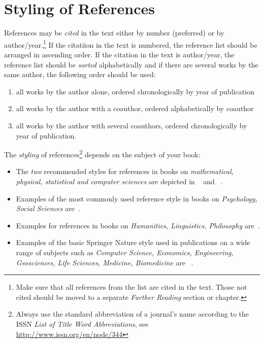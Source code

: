 %
%
% 
% 
%
\section{Styling of References}
References may be \textit{cited} in the text either by number (preferred) or by author/year.\footnote{Make sure that all references from the list are cited in the text. Those not cited should be moved to a separate \textit{Further Reading} section or chapter.} If the citatiion in the text is numbered, the reference list should be arranged in ascending order. If the citation in the text is author/year, the reference list should be \textit{sorted} alphabetically and if there are several works by the same author, the following order should be used:
\begin{enumerate}
\item all works by the author alone, ordered chronologically by year of publication
\item all works by the author with a coauthor, ordered alphabetically by coauthor
\item all works by the author with several coauthors, ordered chronologically by year of publication.
\end{enumerate}
The \textit{styling} of references\footnote{Always use the standard abbreviation of a journal's name according to the ISSN \textit{List of Title Word Abbreviations}, see \url{http://www.issn.org/en/node/344}} depends on the subject of your book:
\begin{itemize}
\item The \textit{two} recommended styles for references in books on \textit{mathematical, physical, statistical and computer sciences} are depicted in ~\cite{science-contrib, science-online, science-mono, science-journal, science-DOI} and ~\cite{phys-online, phys-mono, phys-journal, phys-DOI, phys-contrib}.
\item Examples of the most commonly used reference style in books on \textit{Psychology, Social Sciences} are~\cite{psysoc-mono, psysoc-online,psysoc-journal, psysoc-contrib, psysoc-DOI}.
\item Examples for references in books on \textit{Humanities, Linguistics, Philosophy} are~\cite{humlinphil-journal, humlinphil-contrib, humlinphil-mono, humlinphil-online, humlinphil-DOI}.
\item Examples of the basic Springer Nature style used in publications on a wide range of subjects such as \textit{Computer Science, Economics, Engineering, Geosciences, Life Sciences, Medicine, Biomedicine} are ~\cite{basic-contrib, basic-online, basic-journal, basic-DOI, basic-mono}. 
\end{itemize}


